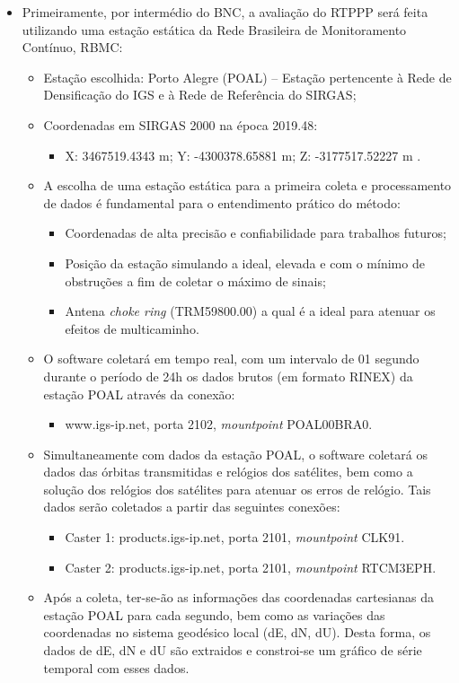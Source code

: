 \begin{itemize}
    \item Primeiramente, por intermédio do BNC, a avaliação do RTPPP será feita utilizando uma estação estática da Rede Brasileira de Monitoramento Contínuo, RBMC:
    \begin{itemize}
        \item Estação escolhida: Porto Alegre (POAL) – Estação pertencente à Rede de Densificação do IGS e à Rede de Referência do SIRGAS;
        \item Coordenadas em SIRGAS 2000 na época 2019.48:
        \begin{itemize}
            \item X: 3467519.4343 m;  Y: -4300378.65881 m; Z: -3177517.52227 m \citep{sirgascon}.
        \end{itemize}
        \item A escolha de uma estação estática para a primeira coleta e processamento de dados é fundamental para o entendimento prático do método:
            \begin{itemize}
            \item Coordenadas de alta precisão e confiabilidade para trabalhos futuros;
            \item Posição da estação simulando a ideal, elevada e com o mínimo de obstruções a fim de coletar o máximo de sinais;
            \item Antena \textit{choke ring} (TRM59800.00) a qual é a ideal para atenuar os efeitos de multicaminho.
            \end{itemize}

        \item O software coletará em tempo real, com um intervalo de 01 segundo durante o período de 24h os dados brutos (em formato RINEX) da estação POAL através da conexão:
        \begin{itemize}
            \item www.igs-ip.net, porta 2102, \textit{mountpoint} POAL00BRA0.
        \end{itemize}
        
        \item Simultaneamente com dados da estação POAL, o software coletará os dados das órbitas transmitidas e relógios dos satélites, bem como a solução dos relógios dos satélites para atenuar os erros de relógio. Tais dados serão coletados a partir das seguintes conexões:
        \begin{itemize}
            \item Caster 1: products.igs-ip.net, porta 2101, \textit{mountpoint} CLK91.
            \item Caster 2: products.igs-ip.net, porta 2101, \textit{mountpoint} RTCM3EPH.
        \end{itemize}
        \item Após a coleta, ter-se-ão as informações das coordenadas cartesianas da estação POAL para cada segundo, bem como as variações das coordenadas no sistema geodésico local (dE, dN, dU). Desta forma, os dados de dE, dN e dU são extraidos e constroi-se um gráfico de série temporal com esses dados.
    

\end{itemize}
\end{itemize}
